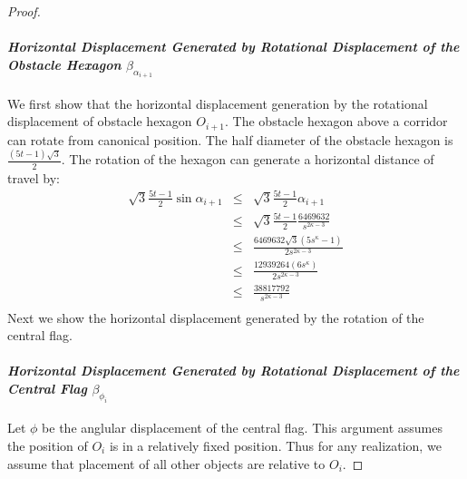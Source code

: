 \documentclass[10pt]{CSUNthesis}
\theoremstyle{plain}%
\theoremstyle{definition}
\theoremstyle{remark}
\newcommand{\lr}[1]{\left( #1 \right)}
\begin{document}
\begin{proof}
\paragraph{\textit{Horizontal Displacement Generated by Rotational Displacement of the Obstacle Hexagon} $\beta_{\alpha_{i+1}}$}
We first show that the horizontal displacement generation by the rotational displacement of obstacle hexagon $O_{i+1}$.  
The obstacle hexagon above a corridor can rotate from canonical position.  
The half diameter of the obstacle hexagon is $ \frac{(5t-1)\sqrt{3}}{2}$.  
The rotation of the hexagon can generate a horizontal distance of travel by:
\begin{equation}
\begin{array}{rcl}
\sqrt{3} \frac{5t-1}{2} \sin \alpha_{i+1} &\leq&\sqrt{3} \frac{5t-1}{2}  \alpha_{i+1} \\
&\leq& \sqrt{3} \frac{5t-1}{2} \frac{6469632}{s^{2\kappa-3}}\\
&\leq& \frac{6469632 \sqrt{3} \lr{5s^\kappa - 1}}{2s^{2\kappa-3}}\\
&\leq& \frac{12939264 \lr{6s^\kappa}}{2s^{2\kappa-3}}\\
&\leq& \frac{38817792}{s^{2\kappa-3}}\\
\end{array}
\end{equation}
Next we show the horizontal displacement generated by the rotation of the central flag.
\paragraph{\textit{Horizontal Displacement Generated by Rotational Displacement of the Central Flag} $\beta_{\phi_{i}}$}
Let $\phi$ be the anglular displacement of the central flag.  
This argument assumes the position of $O_i$ is in a relatively fixed  position.  
Thus for any realization, we assume that placement of all other objects are relative to $O_i$.  


\end{proof}
\end{document}
